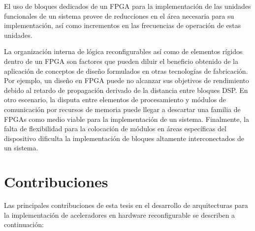 \begin{itemize}
			El uso de bloques dedicados de un FPGA para la implementación de las unidades funcionales de un sistema provee de reducciones en el área necesaria para su implementación, así como incrementos en las frecuencias de operación de estas unidades.

			La organización interna de lógica reconfigurables así como de elementos rígidos dentro de un FPGA son factores que pueden diluir el beneficio obtenido de la aplicación de conceptos de diseño formulados en otras tecnologías de fabricación. Por ejemplo, un diseño en FPGA puede no alcanzar sus objetivos de rendimiento debido al retardo de propagación derivado de la distancia entre bloques DSP. En otro escenario, la disputa entre elementos de procesamiento y módulos de comunicación por recursos de memoria puede llegar a descartar una familia de FPGAs como medio viable para la implementación de un sistema. Finalmente, la falta de flexibilidad para la colocación de módulos en áreas específicas del dispositivo dificulta la implementación de bloques altamente interconectados de un sistema.		

		\end{itemize}

	
\section{Contribuciones}
	\label{contribuciones}

	Las principales contribuciones de esta tesis en el desarrollo de arquitecturas para la implementación de aceleradores en hardware reconfigurable se describen a continuación:

